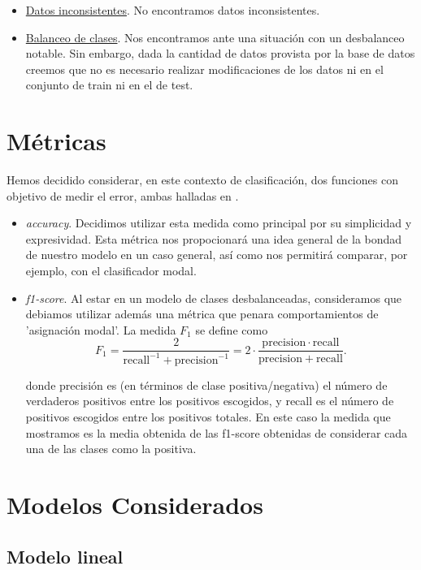 \documentclass[11pt,a4paper]{article}
\begin{document}
\begin{itemize}
	\item \underline{Datos inconsistentes}. No encontramos datos inconsistentes.
	\item \underline{Balanceo de clases}. Nos encontramos ante una situación con un desbalanceo notable. Sin embargo, dada la cantidad de datos provista por la base de datos creemos que no es necesario realizar modificaciones de los datos ni en el conjunto de train ni en el de test.
\end{itemize}




\section{ Métricas }

Hemos decidido considerar, en este contexto de clasificación, dos funciones con objetivo de medir el error, ambas halladas en \cite{met}.
\begin{itemize}
	\item \emph{accuracy}. Decidimos utilizar esta medida como principal por su simplicidad y expresividad. Esta métrica nos propocionará una idea general de la bondad de nuestro modelo en un caso general, así como nos permitirá comparar, por ejemplo, con el clasificador modal. 
	\item \emph{f1-score}. Al estar en un modelo de clases desbalanceadas, consideramos que debiamos utilizar además una métrica que penara comportamientos de 'asignación modal'. La medida $F_1$ se define como\cite{f1}
	$${\displaystyle F_{1}={\frac {2}{\mathrm {recall} ^{-1}+\mathrm {precision} ^{-1}}}=2\cdot {\frac {\mathrm {precision} \cdot \mathrm {recall} }{\mathrm {precision} +\mathrm {recall} }}}.$$
	
	donde precisión es (en términos de clase positiva/negativa) el número de verdaderos positivos entre los positivos escogidos, y recall es el número de positivos escogidos entre los positivos totales. En este caso la medida que mostramos es la media obtenida de las f1-score obtenidas de considerar cada una de las clases como la positiva.
\end{itemize}
\section{ Modelos Considerados }

\subsection{ Modelo lineal }
	
\end{document}
